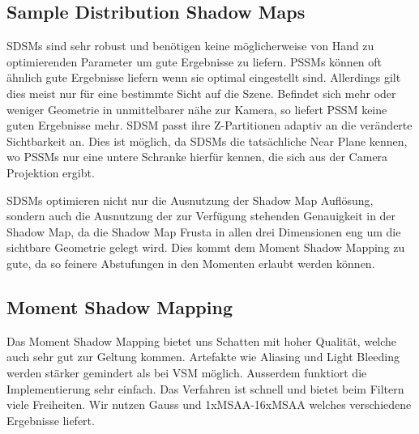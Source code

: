 \documentclass[runningheaders,a4paper]{llncs}
\begin{document}
\subsection{Sample Distribution Shadow Maps}
SDSMs sind sehr robust und benötigen keine möglicherweise von Hand zu optimierenden Parameter um gute Ergebnisse zu liefern.
PSSMs können oft ähnlich gute Ergebnisse liefern wenn sie optimal eingestellt sind.
Allerdings gilt dies meist nur für eine bestimmte Sicht auf die Szene.
Befindet sich mehr oder weniger Geometrie in unmittelbarer nähe zur Kamera, so liefert PSSM keine guten Ergebnisse mehr.
SDSM passt ihre Z-Partitionen adaptiv an die veränderte Sichtbarkeit an.
Dies ist möglich, da SDSMs die tatsächliche Near Plane kennen, wo PSSMs nur eine untere Schranke hierfür kennen, die sich aus der Camera Projektion ergibt.

SDSMs optimieren nicht nur die Ausnutzung der Shadow Map Auflösung, sondern auch die Ausnutzung der zur Verfügung stehenden Genauigkeit in der Shadow Map, da die Shadow Map Frusta in allen drei Dimensionen eng um die sichtbare Geometrie gelegt wird.
Dies kommt dem Moment Shadow Mapping zu gute, da so feinere Abstufungen in den Momenten erlaubt werden können.


\subsection{Moment Shadow Mapping}
Das Moment Shadow Mapping bietet uns Schatten mit hoher Qualität, welche auch sehr gut zur Geltung kommen. Artefakte wie Aliasing und Light Bleeding werden stärker gemindert als bei VSM möglich. Ausserdem funktiort die Implementierung sehr einfach. Das Verfahren ist schnell und bietet beim Filtern viele Freiheiten. Wir nutzen Gauss und 1xMSAA-16xMSAA welches verschiedene Ergebnisse liefert.
\end{document}
